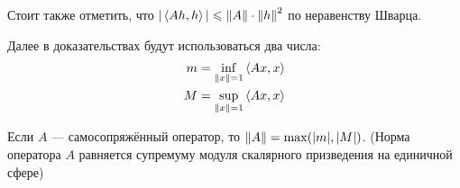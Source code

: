 \documentclass[12pt]{article}
\begin{document}
	Стоит также отметить, что $|\left\langle Ah, h \right\rangle| \leqslant \left\| A \right\| \cdot \left\| h \right\|^2$ по неравенству Шварца.
	
	Далее в доказательствах будут использоваться два числа:
	\begin{equation} \label{eq:mAndM}
		\begin{aligned}
			m &= \underset{\left\| x \right\| = 1}{\inf} \left\langle Ax, x \right\rangle \\
			M &= \underset{\left\| x \right\| = 1}{\sup} \left\langle Ax, x \right\rangle
		\end{aligned}
	\end{equation}
	
	\begin{state}
		Если $A$ --- самосопряжённый оператор, то $\left\| A \right\| = \max(|m|, |M|)$. 
		(Норма оператора $A$ равняется супремуму модуля скалярного призведения на единичной сфере)
	\end{state}
\end{document}
